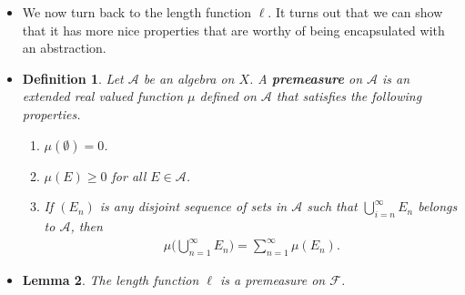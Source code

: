 \documentclass[10pt]{article}
\newtheorem{lemma}{Lemma}
\newtheorem{definition}[lemma]{Definition}
\newcommand{\mcal}[1]{\mathcal{#1}}
\newcommand{\Real}{\mathbb{R}}
\begin{document}
\begin{itemize}
  \begin{proof} We have that:    
  \begin{itemize}
    \item $\emptyset \in \mcal{F}$ because $\emptyset = \{ x : 1 < x \leq 1 \} = (1,1]$.
    \item $\Real = (-\infty, \infty) \in \mcal{F}$ by definition.
    \item $\mcal{F}$ is closed under complementation.
    \begin{itemize}
      \item $(-\infty,b]^c = (b,\infty) \in \mcal{F}$.
      \item $(a,\infty)^c = (-\infty,a] \in \mcal{F}$.
      \item $(a,b]^c = (\infty,a] \cup (b,\infty) \in \mcal{F}$.
      \item $\emptyset$ and $(-\infty,\infty)$ are in $\mcal{F}$.
    \end{itemize}
    \item $\mcal{F}$ is closed under finite unions by definition.
  \end{itemize}
  \end{proof}

  \item We now turn back to the length function $\ell$. It turns out that we can show that it has more nice properties that are worthy of being encapsulated with an abstraction.

  \item \begin{definition}
    Let $\mcal{A}$ be an algebra on $X$. A {\bf premeasure} on $\mcal{A}$ is an extended real valued function $\mu$ defined on $\mcal{A}$ that satisfies the following properties.
    \begin{enumerate}
      \item $\mu(\emptyset) = 0$.
      \item $\mu(E) \geq 0$ for all $E \in \mcal{A}$.
      \item If $(E_n)$ is any disjoint sequence of sets in $\mcal{A}$ such that $\bigcup_{i=n}^\infty E_n$ belongs to $\mcal{A}$, then
      \begin{align*}
        \mu\bigg( \bigcup_{n=1}^\infty E_n \bigg) = \sum_{n=1}^\infty \mu(E_n).
      \end{align*}
    \end{enumerate}
  \end{definition}  

  \item \begin{lemma} \label{lemma:length-is-premeasure}
    The length function $\ell$ is a premeasure on $\mcal{F}$.
  \end{lemma}


\end{itemize}
\end{document}
